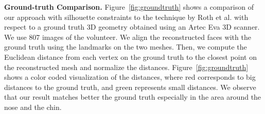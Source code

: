\textbf{Ground-truth Comparison.} Figure~\ref{fig:groundtruth} shows a comparison of our approach with silhouette constraints to the technique by Roth et al. \cite{Roth:2015:UFR} with respect to a ground truth 3D geometry obtained using an Artec Eva 3D scanner. We use 807 images of the volunteer. We align the reconstructed faces with the ground truth using the landmarks on the two meshes. Then, we compute the Euclidean distance from each vertex on the ground truth to the closest point on the reconstructed mesh and normalize the distances. Figure~\ref{fig:groundtruth} shows a color coded visualization of the distances, where red corresponds to big distances to the ground truth, and green represents small distances. We observe that our result matches better the ground truth especially in the area around the nose and the chin. 

